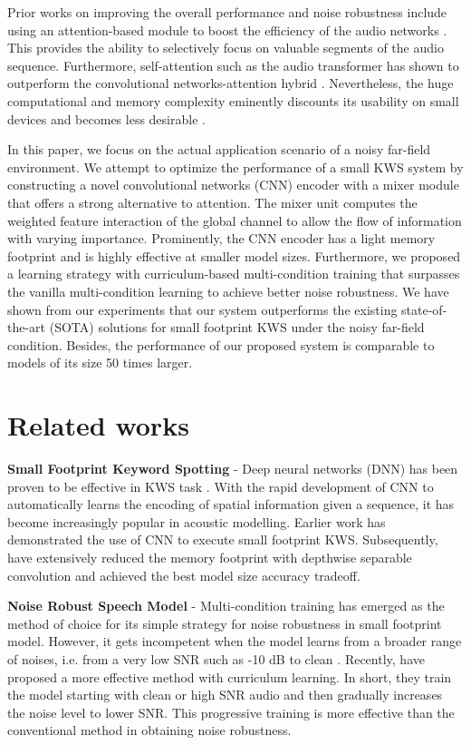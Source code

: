 \documentclass{article}
\begin{document}
Prior works on improving the overall performance and noise robustness include using an attention-based module to boost the efficiency of the audio networks \cite{rybakov2020streaming, zhang2016end, jung2020multi}. This provides the ability to selectively focus on valuable segments of the audio sequence. Furthermore, self-attention such as the audio transformer has shown to outperform the convolutional networks-attention hybrid \cite{gong2021ast, berg2021keyword}. Nevertheless, the huge computational and memory complexity eminently discounts its usability on small devices and becomes less desirable .

In this paper, we focus on the actual application scenario of a noisy far-field environment. We attempt to optimize the performance of a small KWS system by constructing a novel convolutional networks (CNN) encoder with a mixer module that offers a strong alternative to attention. The mixer unit computes the weighted feature interaction of the global channel to allow the flow of information with varying importance. Prominently, the CNN encoder has a light memory footprint and is highly effective at smaller model sizes. Furthermore, we proposed a learning strategy with curriculum-based multi-condition training that surpasses the vanilla multi-condition learning to achieve better noise robustness. We have shown from our experiments that our system outperforms the existing state-of-the-art (SOTA) solutions for small footprint KWS under the noisy far-field condition. Besides, the performance of our proposed system is comparable to models of its size 50 times larger. 




\section{Related works}
\label{sec:prior}
\textbf{Small Footprint Keyword Spotting} - 
Deep neural networks (DNN) has been proven to be effective in KWS task \cite{chen2014small}. With the rapid development of CNN to automatically learns the encoding of spatial information given a sequence, it has become increasingly popular in acoustic modelling. Earlier work \cite{sainath2015convolutional} has demonstrated the use of CNN to execute small footprint KWS. Subsequently, \cite{chollet2017xception, zhang2017hello} have extensively reduced the memory footprint with depthwise separable convolution and achieved the best model size accuracy tradeoff. 


\noindent \textbf{Noise Robust Speech Model} - 
Multi-condition training has emerged as the method of choice for its simple strategy for noise robustness in small footprint model. 
However, it gets incompetent when the model learns from a broader range of noises, i.e. from a very low SNR such as -10 dB to clean \cite{CL2}. Recently, \cite{CL2, CL1} have proposed a more effective method with curriculum learning. In short, they train the model starting with clean or high SNR audio and then gradually increases the noise level to lower SNR. This progressive training is more effective than the conventional method in obtaining noise robustness.
\end{document}
